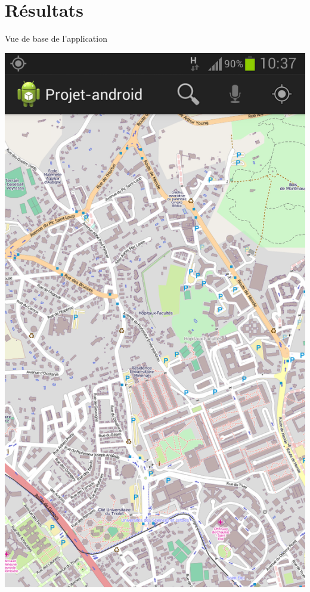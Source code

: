 \documentclass{beamer}
\begin{document}
	\section{Résultats}
		\begin{frame}
			Vue de base de l'application
			\begin{center}
				\includegraphics[scale=0.15]{../rapport/carte.png}
			\end{center}
		\end{frame}
		
\end{document}
